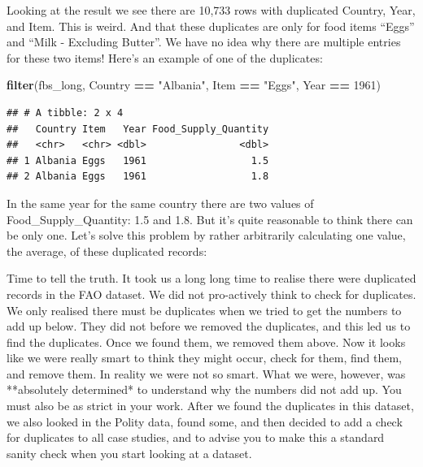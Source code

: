 \documentclass[]{book}
\newenvironment{Shaded}{\begin{snugshade}}{\end{snugshade}}
\newcommand{\DataTypeTok}[1]{\textcolor[rgb]{0.13,0.29,0.53}{#1}}
\newcommand{\DecValTok}[1]{\textcolor[rgb]{0.00,0.00,0.81}{#1}}
\newcommand{\KeywordTok}[1]{\textcolor[rgb]{0.13,0.29,0.53}{\textbf{#1}}}
\newcommand{\NormalTok}[1]{#1}
\newcommand{\OperatorTok}[1]{\textcolor[rgb]{0.81,0.36,0.00}{\textbf{#1}}}
\newcommand{\StringTok}[1]{\textcolor[rgb]{0.31,0.60,0.02}{#1}}
\begin{document}
Looking at the result we see there are 10,733 rows with duplicated Country, Year, and Item. This is weird. And that these duplicates are only for food items ``Eggs'' and ``Milk - Excluding Butter''. We have no idea why there are multiple entries for these two items! Here's an example of one of the duplicates:

\begin{Shaded}
\begin{Highlighting}[]
\KeywordTok{filter}\NormalTok{(fbs_long,}
\NormalTok{       Country }\OperatorTok{==}\StringTok{ "Albania"}\NormalTok{,}
\NormalTok{       Item }\OperatorTok{==}\StringTok{ "Eggs"}\NormalTok{,}
\NormalTok{       Year }\OperatorTok{==}\StringTok{ }\DecValTok{1961}\NormalTok{)}
\end{Highlighting}
\end{Shaded}

\begin{verbatim}
## # A tibble: 2 x 4
##   Country Item   Year Food_Supply_Quantity
##   <chr>   <chr> <dbl>                <dbl>
## 1 Albania Eggs   1961                  1.5
## 2 Albania Eggs   1961                  1.8
\end{verbatim}

In the same year for the same country there are two values of Food\_Supply\_Quantity: 1.5 and 1.8. But it's quite reasonable to think there can be only one. Let's solve this problem by rather arbitrarily calculating one value, the average, of these duplicated records:

\begin{Shaded}
\end{Shaded}

\begin{info}
Time to tell the truth. It took us a long long time to realise there
were duplicated records in the FAO dataset. We did not pro-actively
think to check for duplicates. We only realised there must be duplicates
when we tried to get the numbers to add up below. They did not before we
removed the duplicates, and this led us to find the duplicates. Once we
found them, we removed them above. Now it looks like we were really
smart to think they might occur, check for them, find them, and remove
them. In reality we were not so smart. What we were, however, was
**absolutely determined* to understand why the numbers did not add up.
You must also be as strict in your work. After we found the duplicates
in this dataset, we also looked in the Polity data, found some, and then
decided to add a check for duplicates to all case studies, and to advise
you to make this a standard sanity check when you start looking at a
dataset.
\end{info}
\end{document}
